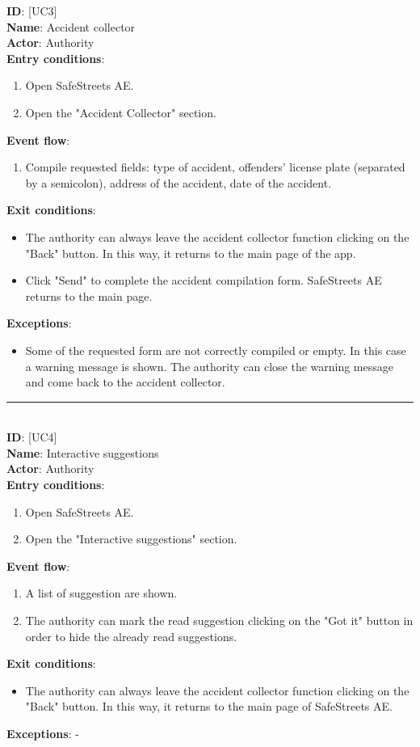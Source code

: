 \documentclass{article}
\newcommand\usecase[1]{ [UC#1] }
\begin{document}
				\textbf{ID}: \usecase{3} \\
				\textbf{Name}:   Accident collector\\
				\textbf{Actor}:  Authority\\
				\textbf{Entry conditions}:
				\begin{enumerate}
					\item Open SafeStreets AE.
					\item Open the "Accident Collector" section.
				\end{enumerate}
				\textbf{Event flow}:
				\begin{enumerate}
					\item Compile requested fields: type of accident, offenders' license plate (separated by a semicolon), address of the accident, date of the accident.
				\end{enumerate}
				\textbf{Exit conditions}:
				\begin{itemize}
					\item The authority can always leave the accident collector function clicking on the "Back" button. In this way, it returns to the main page of the app.
					\item Click "Send" to complete the accident compilation form. SafeStreets AE returns to the main page.
				\end{itemize}
				\textbf{Exceptions}:
				\begin{itemize}
					\item Some of the requested form are not correctly compiled or empty. In this case a warning message is shown. The authority can close the warning message and come back to the accident collector.\\
				\end{itemize}
				
				\rule{\linewidth}{0.4pt}
				\\
								
				\textbf{ID}: \usecase{4} \\
				\textbf{Name}:   Interactive suggestions\\
				\textbf{Actor}:  Authority\\
				\textbf{Entry conditions}:
				\begin{enumerate}
					\item Open SafeStreets AE.
					\item Open the "Interactive suggestions" section.
				\end{enumerate}
				\textbf{Event flow}:
				\begin{enumerate}
					\item A list of suggestion are shown.
					\item The authority can mark the read suggestion clicking on the "Got it" button in order to hide the already read suggestions.
				\end{enumerate}
				\textbf{Exit conditions}:
				\begin{itemize}
				   \item The authority can always leave the accident collector function clicking on the "Back" button. In this way, it returns to the main page of SafeStreets AE.
				\end{itemize}
				\textbf{Exceptions}: -\\
				
\end{document}
